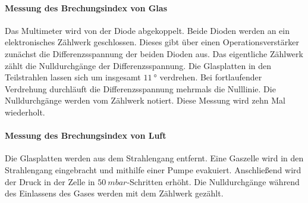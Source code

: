 \paragraph{Messung des Brechungsindex von Glas}
Das Multimeter wird von der Diode abgekoppelt.
Beide Dioden werden an ein elektronisches Zählwerk geschlossen.
Dieses gibt über einen Operationsverstärker zunächst die Differenzsspannung der beiden Dioden aus.
Das eigentliche Zählwerk zählt die Nulldurchgänge der Differenzsspannung.
Die Glasplatten in den Teilstrahlen lassen sich um insgesamt $\SI{11}{°}$ verdrehen.
Bei fortlaufender Verdrehung durchläuft die Differenzsspannung mehrmals die Nulllinie.
Die Nulldurchgänge werden vom Zählwerk notiert.
Diese Messung wird zehn Mal wiederholt.

\paragraph{Messung des Brechungsindex von Luft}
Die Glasplatten werden aus dem Strahlengang entfernt.
Eine Gaszelle wird in den Strahlengang eingebracht und mithilfe einer Pumpe evakuiert.
Anschließend wird der Druck in der Zelle in $\SI{50}{mbar}$-Schritten erhöht.
Die Nulldurchgänge während des Einlassens des Gases werden mit dem Zählwerk gezählt.
